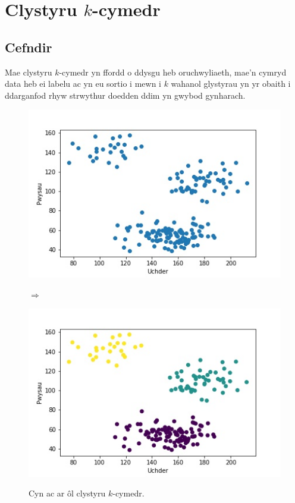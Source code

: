 \chapter{Clystyru $k$-cymedr}\label{cha:literature}
\section{Cefndir}\label{sec:axelrodoriginal}
Mae clystyru $k$-cymedr yn ffordd o ddysgu heb oruchwyliaeth, mae'n cymryd data heb ei labelu ac yn eu sortio i mewn i $k$ wahanol glystyrau yn yr obaith i ddarganfod rhyw strwythur doedden ddim yn gwybod gynharach.

\begin{figure}
\begin{center}
\begin{minipage}{.4\linewidth}
\includegraphics[width=1\linewidth]{../img/Scatterpython.jpeg}
\end{minipage}%
\begin{minipage}{1cm}
$\Rightarrow$
\end{minipage}%
\begin{minipage}{.4\linewidth}
\includegraphics[width=1\linewidth]{../img/3clystwrpython.jpeg}
\end{minipage}%
\label{fig:Cefndir_Clysteru_k_modd}
\caption{Cyn ac ar \^{o}l clystyru $k$-cymedr.}
\end{center}
\end{figure}

